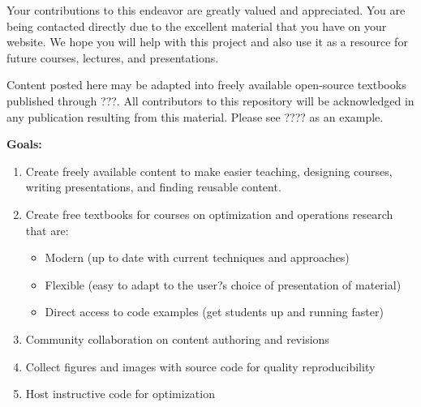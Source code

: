 \documentclass[../open-optimization/open-optimization.tex]{subfiles}
\begin{document}
Your contributions to this endeavor are greatly valued and appreciated.  You are being contacted directly due to the excellent material that you have on your website.  We hope you will help with this project and also use it as a resource for future courses, lectures, and presentations.

Content posted here may be adapted into freely available open-source textbooks published through ???.  All contributors to this repository will be acknowledged in any publication resulting from this material.  Please see ???? as an example.



\textbf{Goals:}
\begin{enumerate}
\item Create freely available content to make easier teaching, designing courses, writing presentations, and finding reusable content.
\item Create free textbooks for courses on optimization and operations research that are:
\begin{itemize}
\item Modern (up to date with current techniques and approaches)
\item Flexible (easy to adapt to the user?s choice of presentation of material)
\item Direct access to code examples (get students up and running faster)
\end{itemize}
\item Community collaboration on content authoring and revisions
\item Collect figures and images with source code for quality reproducibility
\item Host instructive code for optimization
\end{enumerate}










\end{document}
